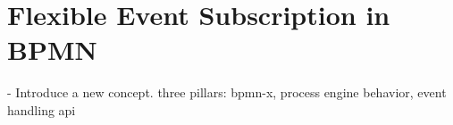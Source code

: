 \chapter{Flexible Event Subscription in BPMN}\label{ch:flexibleeventsubscription}

- Introduce a new concept. three pillars: bpmn-x, process engine behavior, event handling api

\label{fig:concept-modules}



